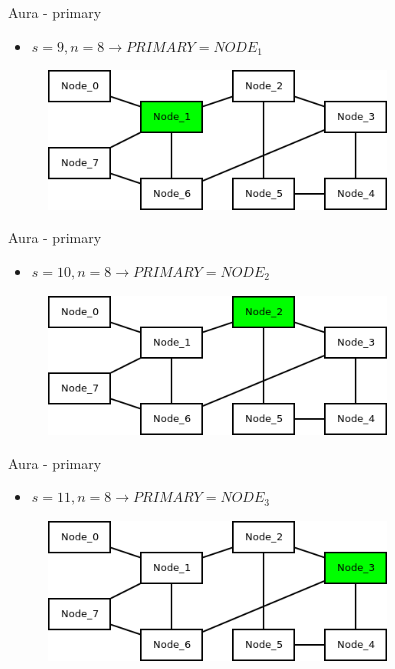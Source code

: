 \documentclass[10pt]{beamer}
\begin{document}
\begin{frame}{Aura - primary}
	\begin{itemize}
		\item $s = 9, n = 8 \rightarrow PRIMARY = NODE_1$
	\end{itemize}
	\begin{figure}
		\includegraphics[width=0.8\textwidth]{images/aura_2.png}
	\end{figure}
\end{frame}

\begin{frame}{Aura - primary}
	\begin{itemize}
		\item $s = 10, n = 8 \rightarrow PRIMARY = NODE_2$
	\end{itemize}
	\begin{figure}
		\includegraphics[width=0.8\textwidth]{images/aura_3.png}
	\end{figure}
\end{frame}

\begin{frame}{Aura - primary}
	\begin{itemize}
		\item $s =11, n = 8 \rightarrow PRIMARY = NODE_3$
	\end{itemize}
	\begin{figure}
		\includegraphics[width=0.8\textwidth]{images/aura_4.png}
	\end{figure}
\end{frame}
\end{document}
